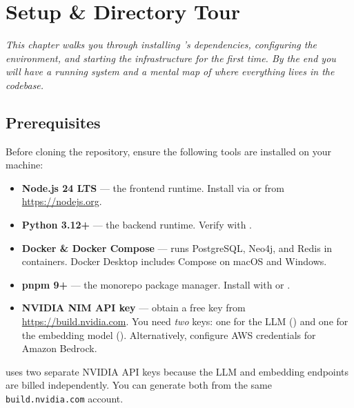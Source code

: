 \chapter{Setup \& Directory Tour}
\label{ch:setup-directory-tour}

\textit{This chapter walks you through installing \sysname{}'s dependencies,
configuring the environment, and starting the infrastructure for the first time.
By the end you will have a running system and a mental map of where everything
lives in the codebase.}

\section{Prerequisites}
\label{sec:prerequisites}

Before cloning the repository, ensure the following tools are installed on your
machine:

\begin{itemize}
    \item \textbf{Node.js 24 LTS} --- the frontend runtime.  Install via
           or from \url{https://nodejs.org}.
    \item \textbf{Python 3.12+} --- the backend runtime.  Verify with
          .
    \item \textbf{Docker \& Docker Compose} --- runs PostgreSQL, Neo4j, and
          Redis in containers.  Docker Desktop includes Compose on macOS and
          Windows.
    \item \textbf{pnpm 9+} --- the monorepo package manager.  Install with
           or .
    \item \textbf{NVIDIA NIM API key} --- obtain a free key from
          \url{https://build.nvidia.com}.  You need \emph{two} keys: one for the
          LLM () and one for the embedding model
          ().  Alternatively, configure
          AWS credentials for Amazon Bedrock.
\end{itemize}

\begin{keyinsight}
\sysname{} uses two separate NVIDIA API keys because the LLM and embedding
endpoints are billed independently.  You can generate both from the same
\texttt{build.nvidia.com} account.
\end{keyinsight}


